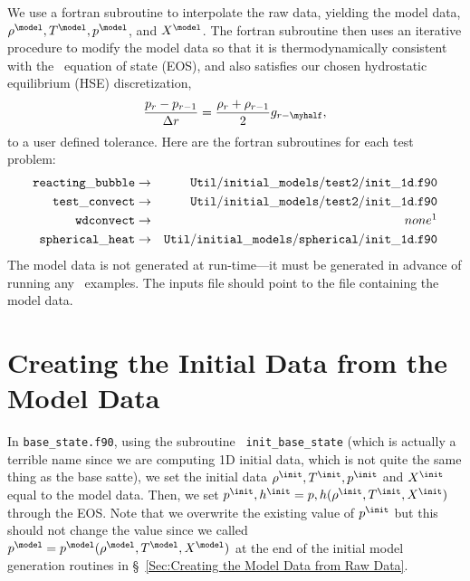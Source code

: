 We use a fortran subroutine
to interpolate the raw data, yielding the model data, $\rho^{\model},
T^{\model}, p^{\model}$, and $X^{\model}$.  The fortran subroutine
then uses an iterative procedure to modify the model data so that it
is thermodynamically consistent with the \maestro\ equation of
state (EOS), and also satisfies our chosen hydrostatic equilibrium
(HSE) discretization,
\begin{equation}
\frac{p_r - p_{r-1}}{\Delta r} = \frac{\rho_r + \rho_{r-1}}{2}g_{r-\myhalf},\label{HSE Discretization}
\end{equation}
to a user defined tolerance.  Here are the fortran subroutines for each test problem:
\begin{eqnarray}
{\tt reacting\_bubble} & \rightarrow & {\tt Util/initial\_models/test2/init\_1d.f90} \nonumber \\
{\tt test\_convect} & \rightarrow & {\tt Util/initial\_models/test2/init\_1d.f90} \nonumber \\
{\tt wdconvect} & \rightarrow & none\footnotemark \nonumber \\
{\tt spherical\_heat} & \rightarrow & {\tt Util/initial\_models/spherical/init\_1d.f90} \nonumber \\
\end{eqnarray}
The model data is not generated at run-time---it must be generated in
advance of running any \maestro\ examples.  The inputs file should point
to the file containing the model data.

\section{Creating the Initial Data from the Model Data}
In {\tt base\_state.f90}, using the subroutine {\tt
  init\_base\_state} (which is actually a terrible name since we
are computing 1D initial data, which is not quite the same thing 
as the base satte), we set the initial
data $\rho^{\init}, T^{\init}, p^{\init}$ and $X^{\init}$ equal to the
model data.  Then, we set $p^{\init},h^{\init} =
p,h(\rho^{\init},T^{\init},X^{\init})$ through the EOS.  Note that 
we overwrite the existing value of $p^{\init}$ but this should not change
the value since we called 
$p^{\model} = p^{\model}(\rho^{\model},T^{\model},X^{\model})$ at the end of the
initial model generation routines in 
\S~\ref{Sec:Creating the Model Data from Raw Data}.

